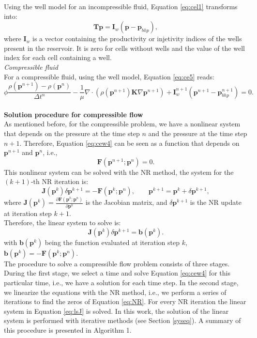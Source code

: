 \documentclass[review]{elsarticle}
\begin{document}
Using the well model for an incompressible fluid, Equation \eqref{eq:cel1} transforms into:
 \begin{equation}\label{eq:celw1}
\mathbf{T}\mathbf{p} = \mathbf{I}_w(\mathbf{p}-\mathbf{p}_{bhp}),
\end{equation}
where $\mathbf{I}_w$ is a vector containing the productivity or injetivity indices of the wells present in the reservoir. 
It is zero for cells without wells and the value of the well index for each cell containing a well.\\
\emph{Compressible fluid}\\
For a compressible fluid, using the well model, Equation \eqref{eq:ce5} reads:
\begin{equation}\label{eq:cew4}
 {\phi}\frac{{\rho}(\mathbf{p}^{n+1})
 -{\rho}(\mathbf{p}^{n})}{\Delta t^n}
 -\frac{1}{\mu}\nabla \cdot ({\rho}(\mathbf{p}^{n+1}) 
 \mathbf{K}\nabla\mathbf{p}^{n+1})+\mathbf{I}_w^{n+1}(\mathbf{p}^{n+1}-\mathbf{p}_{bhp}^{n+1})=0.
\end{equation}\\
\textbf{Solution procedure for compressible flow}\\
As mentioned before, for the compressible problem, we have a nonlinear system that depends on the pressure at the time step $n$ and the pressure at the time step $n+1$. Therefore, Equation \eqref{eq:cew4} can be seen as a function that depends on $\mathbf{p}^{n+1}$ and $\mathbf{p}^{n}$, i.e.,
\begin{equation}\label{eq:NR}
 \mathbf{F}(\mathbf{p}^{n+1};\mathbf{p}^n)=0.
\end{equation}
This nonlinear system can be solved with the NR method, the system for the $(k+1)$-th NR iteration is:
$$\mathbf{J}(\mathbf{p}^k)\delta\mathbf{p}^{k+1}=-\mathbf{F}(\mathbf{p}^k;\mathbf{p}^n),
\qquad \mathbf{p}^{k+1}=\mathbf{p}^k+\delta \mathbf{p}^{k+1},$$
where $\mathbf{J}(\mathbf{p}^k)=\frac{\partial \mathbf{F}(\mathbf{p}^k;\mathbf{p}^n)}{\partial \mathbf{p}^k}$ is the 
Jacobian matrix, and $\delta \mathbf{p}^{k+1}$ is the NR update at iteration step $k+1$.\\
Therefore, the linear system to solve is:\\
\begin{equation}\label{eq:lsJ}
\mathbf{J}(\mathbf{p}^k)\delta \mathbf{p}^{k+1}=\mathbf{b}(\mathbf{p}^k).
\end{equation}
with $\mathbf{b}(\mathbf{p}^k)$ being the function evaluated at iteration step $k$, $\mathbf{b}(\mathbf{p}^k)=-\mathbf{F}(\mathbf{p}^k;\mathbf{p}^n)$.\\
The procedure to solve a compressible flow problem consists of three stages. During the first stage, we select a 
time and solve Equation \eqref{eq:cew4} for this particular time, i.e., we have a solution for each time step. In the second stage, 
we linearize the equations with the NR method, i.e., we perform a series of iterations to find the 
zeros of Equation \eqref{eq:NR}. For every NR iteration the linear system in Equation \eqref{eq:lsJ} is solved. 
In this work, the solution of the linear system is performed with iterative methods (see Section \ref{syseq}). A summary of 
this procedure is presented in Algorithm 1.
\end{document}
